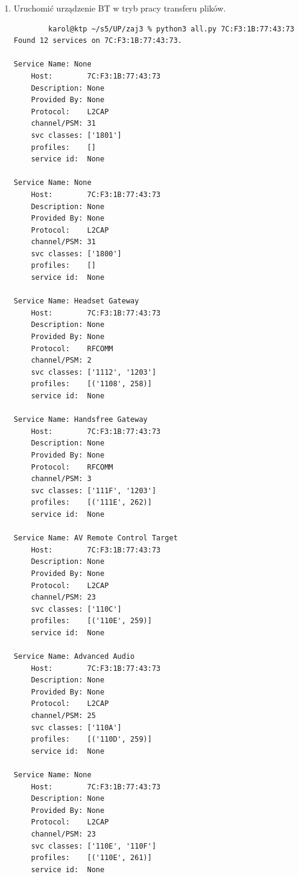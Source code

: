 \documentclass[a4paper,12pt]{extarticle}  %
\begin{document}
\begin{enumerate}
\begin{itemize}
\begin{figure}[H]
				 \centering
			  \end{figure}
	      \end{itemize}
	\item Uruchomić urządzenie BT w tryb pracy transferu plików.
	\begin{lstlisting}
		karol@ktp ~/s5/UP/zaj3 % python3 all.py 7C:F3:1B:77:43:73
Found 12 services on 7C:F3:1B:77:43:73.

Service Name: None
    Host:        7C:F3:1B:77:43:73
    Description: None
    Provided By: None
    Protocol:    L2CAP
    channel/PSM: 31
    svc classes: ['1801']
    profiles:    []
    service id:  None

Service Name: None
    Host:        7C:F3:1B:77:43:73
    Description: None
    Provided By: None
    Protocol:    L2CAP
    channel/PSM: 31
    svc classes: ['1800']
    profiles:    []
    service id:  None

Service Name: Headset Gateway
    Host:        7C:F3:1B:77:43:73
    Description: None
    Provided By: None
    Protocol:    RFCOMM
    channel/PSM: 2
    svc classes: ['1112', '1203']
    profiles:    [('1108', 258)]
    service id:  None

Service Name: Handsfree Gateway
    Host:        7C:F3:1B:77:43:73
    Description: None
    Provided By: None
    Protocol:    RFCOMM
    channel/PSM: 3
    svc classes: ['111F', '1203']
    profiles:    [('111E', 262)]
    service id:  None

Service Name: AV Remote Control Target
    Host:        7C:F3:1B:77:43:73
    Description: None
    Provided By: None
    Protocol:    L2CAP
    channel/PSM: 23
    svc classes: ['110C']
    profiles:    [('110E', 259)]
    service id:  None

Service Name: Advanced Audio
    Host:        7C:F3:1B:77:43:73
    Description: None
    Provided By: None
    Protocol:    L2CAP
    channel/PSM: 25
    svc classes: ['110A']
    profiles:    [('110D', 259)]
    service id:  None

Service Name: None
    Host:        7C:F3:1B:77:43:73
    Description: None
    Provided By: None
    Protocol:    L2CAP
    channel/PSM: 23
    svc classes: ['110E', '110F']
    profiles:    [('110E', 261)]
    service id:  None


\end{lstlisting}
\end{enumerate}
\end{document}
